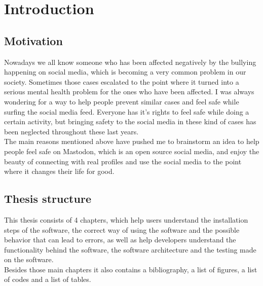 \chapter{Introduction}
\label{ch:intro}

\section{Motivation}
Nowadays we all know someone who has been affected negatively
by the bullying happening on social media, which is becoming
a very common problem in our society. Sometimes those cases
escalated to the point where it turned into a serious mental
health problem for the ones who have been affected. I was
always wondering for a way to help people prevent similar
cases and feel safe while surfing the social media feed.
Everyone has it's rights to feel safe while doing a certain
activity, but bringing safety to the social media in these
kind of cases has been neglected throughout these last years.
\\[5pt]
The main reasons mentioned above have pushed me to brainstorm
an idea to help people feel safe on Mastodon, which is an open source social media,
and enjoy the beauty of connecting with real profiles and use the
social media to the point where it changes their life for good.

\section{Thesis structure}
This thesis consists of 4 chapters, which help users understand the
installation steps of the software, the correct way of using the software
and the possible behavior that can lead to errors, as well as help developers
understand the functionality behind the software,
the software architecture and the testing made on the software.
\\[5pt]
Besides those main chapters it also contains a bibliography,
a list of figures, a list of codes and a list of tables.